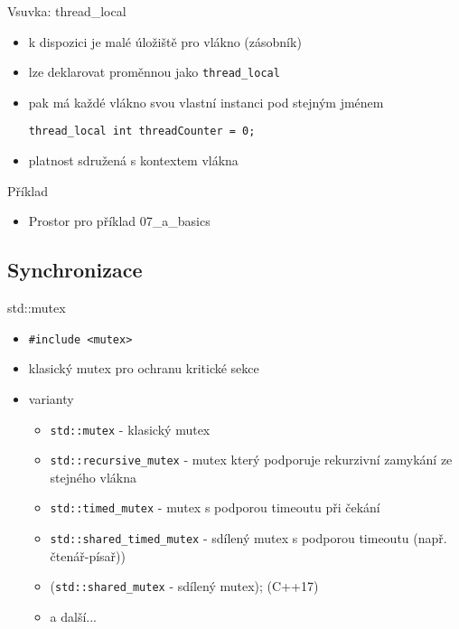 \documentclass{beamer}
\begin{document}
\begin{xframe}{Vsuvka: thread\_local}
	\begin{itemize}
		\item k dispozici je malé úložiště pro vlákno (zásobník)
		\item lze deklarovat proměnnou jako \texttt{thread\_local}
		\item pak má každé vlákno svou vlastní instanci pod stejným jménem
\begin{lstlisting}[basicstyle=\fontsize{8}{9}\selectfont\ttfamily]
thread_local int threadCounter = 0;
\end{lstlisting}
		\item platnost sdružená s kontextem vlákna
	\end{itemize}
\end{xframe}

\begin{xframe}{Příklad}
	\begin{itemize}
		\item Prostor pro příklad 07\_a\_basics
	\end{itemize}
\end{xframe}



\subsection{Synchronizace}

\begin{xframe}{std::mutex}
	\begin{itemize}
		\item \texttt{\#include <mutex>}
		\item klasický mutex pro ochranu kritické sekce
		\item varianty
			\begin{itemize}
				\item \texttt{std::mutex} - klasický mutex
				\item \texttt{std::recursive\_mutex} - mutex který podporuje rekurzivní zamykání ze stejného vlákna
				\item \texttt{std::timed\_mutex} - mutex s podporou timeoutu při čekání
				\item \texttt{std::shared\_timed\_mutex} - sdílený mutex s podporou timeoutu (např. čtenář-písař))
				\item (\texttt{std::shared\_mutex} - sdílený mutex); (C++17)
				\item a další...
			\end{itemize}
	\end{itemize}
\end{xframe}
\end{document}
